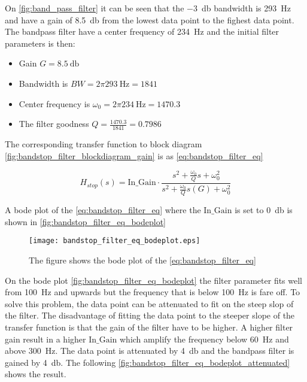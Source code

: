 On \autoref{fig:band_pass_filter} it can be seen that the \SI{-3}{\decibel} bandwidth is \SI{293}{\hertz} and have a gain of \SI{8.5}{\decibel} from the lowest data point to the fighest data point. The bandpass filter have a center frequency of \SI{234}{\hertz} and the initial filter parameters is then:

\begin{itemize}
\item Gain $G = \SI{8.5}{\decibel}$
\item Bandwidth is $BW = 2\pi \SI{293}{\hertz} = 1841$
\item Center frequency is $\omega_0 = 2\pi \SI{234}{\hertz} = 1470.3$
\item The filter goodness $Q = \frac{1470.3}{1841} = 0.7986$
\end{itemize}

The corresponding transfer function to block diagram \autoref{fig:bandstop_filter_blockdiagram_gain} is as \autoref{eq:bandstop_filter_eq}

\begin{equation}\label{eq:bandstop_filter_eq}
H_{stop}(s) = \text{In_Gain} \cdot \frac{s^2+\frac{\omega_0}{Q}s+\omega_0^2}{s^2+\frac{\omega_0}{Q}s(G)+\omega_0^2}
\end{equation}

    \startexplain
    \stopexplain


A bode plot of the \autoref{eq:bandstop_filter_eq} where the $\text{In_Gain}$ is set to \SI{0}{\decibel} is shown in \autoref{fig:bandstop_filter_eq_bodeplot}



\begin{figure}[H]
	\centering
	\texttt{[image: bandstop\_filter\_eq\_bodeplot.eps]}
	\caption{The figure shows the bode plot of the \autoref{eq:bandstop_filter_eq}}
		\label{fig:bandstop_filter_eq_bodeplot}
\end{figure}

On the bode plot  \autoref{fig:bandstop_filter_eq_bodeplot} the filter parameter fits well from \SI{100}{\hertz} and upwards but the frequency that is below \SI{100}{\hertz} is fare off. To solve this problem, the data point can be attenuated to fit on the steep slop of the filter. The disadvantage of fitting the data point to the steeper slope of the transfer function is that the gain of the filter have to be higher. A higher filter gain result in a higher $\text{In_Gain}$ which amplify the frequency below \SI{60}{\hertz} and above \SI{300}{\hertz}. The data point is attenuated by \SI{4}{\decibel} and the bandpass filter is gained by \SI{4}{\decibel}. The following \autoref{fig:bandstop_filter_eq_bodeplot_attenuated} shows the result.

